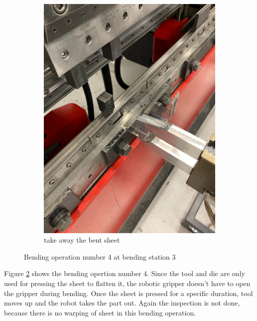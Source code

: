 \begin{figure}[h]
\begin{subfigure}[b]{0.32\textwidth}
        \includegraphics[width=\textwidth]{figures/bending/bending4-003.png}
        \caption{take away the bent sheet}
        \label{subfig:bending4-after}
    \end{subfigure}\hspace{0.1cm}
    \caption{Bending operation number 4 at bending station 3}
    \label{fig:bending-operation-4}
\end{figure}


Figure \ref{fig:bending-operation-4} shows the bending opertion number 4. Since the tool and die are only used for pressing the sheet to flatten it, the robotic gripper doesn't have to open the gripper during bending. Once the sheet is pressed for a specific duration, tool moves up and the robot takes the part out.  Again the inspection is not done, because there is no warping of sheet in this bending operation.


